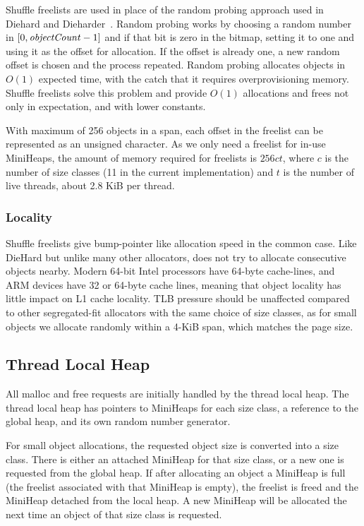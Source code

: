 Shuffle freelists are used in place of the random probing approach
used in Diehard and
Dieharder~\cite{1134000,Novark:2010:DSH:1866307.1866371}.  Random
probing works by choosing a random number in
$[0,\text{\textit{objectCount}}-1]$ and if that bit is zero in the
bitmap, setting it to one and using it as the offset for allocation.
If the offset is already one, a new random offset is chosen and the
process repeated.  Random probing allocates objects in $O(1)$ expected
time, with the catch that it requires overprovisioning memory.
Shuffle freelists solve this problem and provide $O(1)$ allocations
and frees not only in expectation, and with lower constants.

With maximum of 256 objects in a span, each offset in the freelist can
be represented as an unsigned character.  As we only need a freelist
for in-use MiniHeaps, the amount of memory required for freelists is
$256ct$, where $c$ is the number of size classes (11 in the current
implementation) and $t$ is the number of live threads, about 2.8 KiB
per thread.

\subsubsection{Locality}

Shuffle freelists give \Mesh bump-pointer like allocation speed in the
common case.  Like DieHard but unlike many other allocators, \Mesh
does not try to allocate consecutive objects nearby.  Modern 64-bit
Intel processors have 64-byte cache-lines, and ARM devices have 32 or
64-byte cache lines, meaning that object locality has little impact on
L1 cache locality.  TLB pressure should be unaffected compared to
other segregated-fit allocators with the same choice of size classes,
as for small objects we allocate randomly within a 4-KiB span, which
matches the page size.

\subsection{Thread Local Heap}

All malloc and free requests are initially handled by the thread local
heap.  The thread local heap has pointers to MiniHeaps for each size
class, a reference to the global heap, and its own random number
generator.

For small object allocations, the requested object size is converted
into a size class.  There is either an attached MiniHeap for that size
class, or a new one is requested from the global heap.  If after
allocating an object a MiniHeap is full (the freelist associated with
that MiniHeap is empty), the freelist is freed and the MiniHeap
detached from the local heap.  A new MiniHeap will be allocated the
next time an object of that size class is requested.

